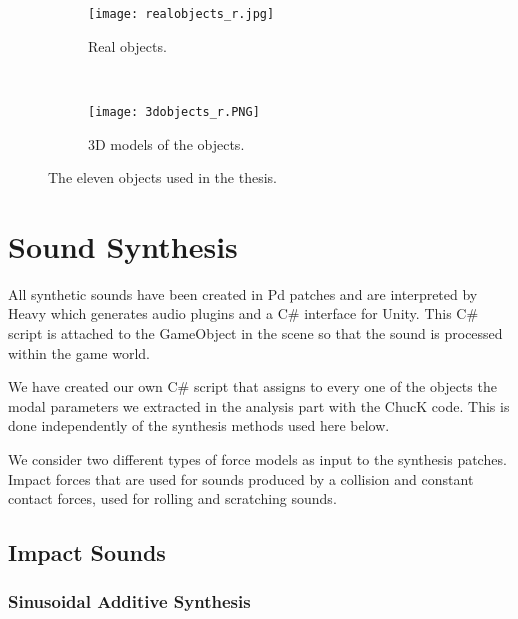 \begin{figure}[H]
    \centering
    \begin{subfigure}[b]{0.7\textwidth}
        \texttt{[image: realobjects\_r.jpg]}
        \caption{Real objects.}
        \label{fig:real}
    \end{subfigure}
    ~ %
    \begin{subfigure}[b]{0.7\textwidth}
        \texttt{[image: 3dobjects\_r.PNG]}
        \caption{3D models of the objects.}
        \label{fig:models}
    \end{subfigure}
    \caption{The eleven objects used in the thesis.}\label{fig:objects}
\end{figure}

\section{Sound Synthesis}

All synthetic sounds have been created in Pd patches and are interpreted by Heavy which generates audio plugins and a C\# interface for Unity. This C\# script is attached to the GameObject in the scene so that the sound is processed within the game world.

We have created our own C\# script that assigns to every one of the objects  the modal parameters we extracted in the analysis part with the ChucK code. This is done independently of the synthesis methods used here below.

We consider two different types of force models as input to the synthesis patches. Impact forces that are used for sounds produced by a collision and constant contact forces, used for rolling and scratching sounds.



\subsection{Impact Sounds}
%
\subsubsection{Sinusoidal Additive Synthesis}

